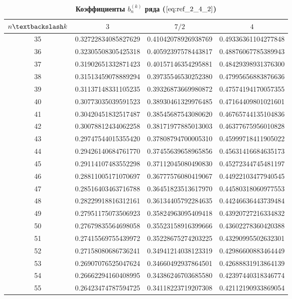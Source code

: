 \begin{table}[]
\caption{\textbf{Коэффициенты $b_n^{(k)}$ ряда ($\ref{eq:ref_2_4_2}$)}}
\begin{center}
\begin{tabular}{|c|c|c|c|}
\hline
$n \textbackslash k$ & $3$ & $7/2$ & $4$ \\
\hline
35 & 0.32722834085827629 & 0.41042078926938769 & 0.49336361104277848 \\
36 & 0.32305508305425318 & 0.40592397578443817 & 0.48876067785389943 \\
37 & 0.31902651332871423 & 0.40157146354295881 & 0.48429398931376300 \\
38 & 0.31513459078889294 & 0.39735546530252380 & 0.47995656883876636 \\
39 & 0.31137148331105235 & 0.39326873669980872 & 0.47574194170057355 \\
40 & 0.30773035039591523 & 0.38930461329976485 & 0.47164409801021601 \\
41 & 0.30420451832517487 & 0.38545687543080620 & 0.46765744135104836 \\
42 & 0.30078812434062258 & 0.38171977885013003 & 0.46377675956010828 \\
43 & 0.29747544015355420 & 0.37808794700005310 & 0.45999718411905022 \\
44 & 0.29426140684761770 & 0.37455639658965856 & 0.45631416684635173 \\
45 & 0.29114107483552298 & 0.37112045080490830 & 0.45272344745481197 \\
46 & 0.28811005171070697 & 0.36777576080419067 & 0.44922103477940545 \\
47 & 0.28516403463716788 & 0.36451823513617970 & 0.44580318060977553 \\
48 & 0.28229918816312161 & 0.36134405792284635 & 0.44246636443739484 \\
49 & 0.27951175073506923 & 0.35824963095409418 & 0.43920727216334832 \\
50 & 0.27679835564698058 & 0.35523158916399666 & 0.43602278360420388 \\
51 & 0.27415569755439972 & 0.35228675274203225 & 0.43290995502632301 \\
52 & 0.27158080686736241 & 0.34941214038123319 & 0.42986600883464449 \\
53 & 0.26907076525047624 & 0.34660492937864501 & 0.42688831913864139 \\
54 & 0.26662294160408995 & 0.34386246703685580 & 0.42397440318346774 \\
55 & 0.26423474787594725 & 0.34118223719207308 & 0.42112190933869054 \\

\end{tabular}
\end{center}
\end{table}
